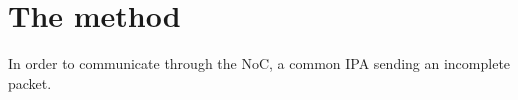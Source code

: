 \chapter{The method}
\label{ch:themethod}


In order to communicate through the \ac{NoC}, a common \ac{IPA} sending an incomplete packet.

